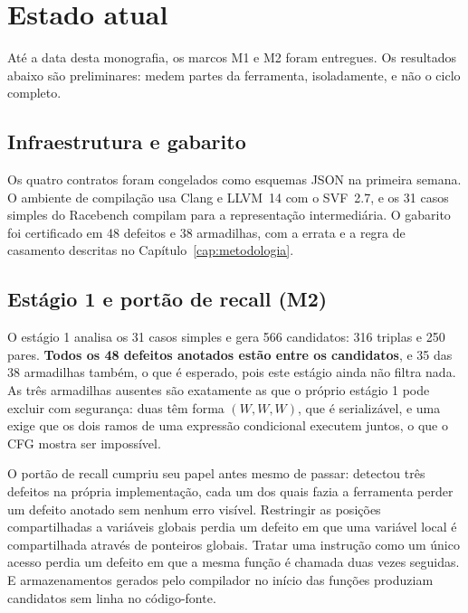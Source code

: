 
\section{Estado atual}
\label{sec:estado}

Até a data desta monografia, os marcos M1 e M2 foram entregues. Os resultados
abaixo são preliminares: medem partes da ferramenta, isoladamente, e não o
ciclo completo.

\subsection{Infraestrutura e gabarito}

Os quatro contratos foram congelados como esquemas JSON na primeira semana. O
ambiente de compilação usa Clang e LLVM~14 com o SVF~2.7, e os 31 casos simples
do Racebench compilam para a representação intermediária. O gabarito foi
certificado em 48 defeitos e 38 armadilhas, com a errata e a regra de
casamento descritas no Capítulo~\ref{cap:metodologia}.

\subsection{Estágio 1 e portão de recall (M2)}

O estágio 1 analisa os 31 casos simples e gera 566 candidatos: 316 triplas e 250
pares. \textbf{Todos os 48 defeitos anotados estão entre os candidatos}, e 35
das 38 armadilhas também, o que é esperado, pois este estágio ainda não filtra
nada. As três armadilhas ausentes são exatamente as que o próprio estágio 1 pode
excluir com segurança: duas têm forma $(W,W,W)$, que é serializável, e uma
exige que os dois ramos de uma expressão condicional executem juntos, o que o
CFG mostra ser impossível.

O portão de recall cumpriu seu papel antes mesmo de passar: detectou três
defeitos na própria implementação, cada um dos quais fazia a ferramenta perder
um defeito anotado sem nenhum erro visível. Restringir as posições
compartilhadas a variáveis globais perdia um defeito em que uma variável local é
compartilhada através de ponteiros globais. Tratar uma instrução como um único
acesso perdia um defeito em que a mesma função é chamada duas vezes seguidas. E
armazenamentos gerados pelo compilador no início das funções produziam
candidatos sem linha no código-fonte.

